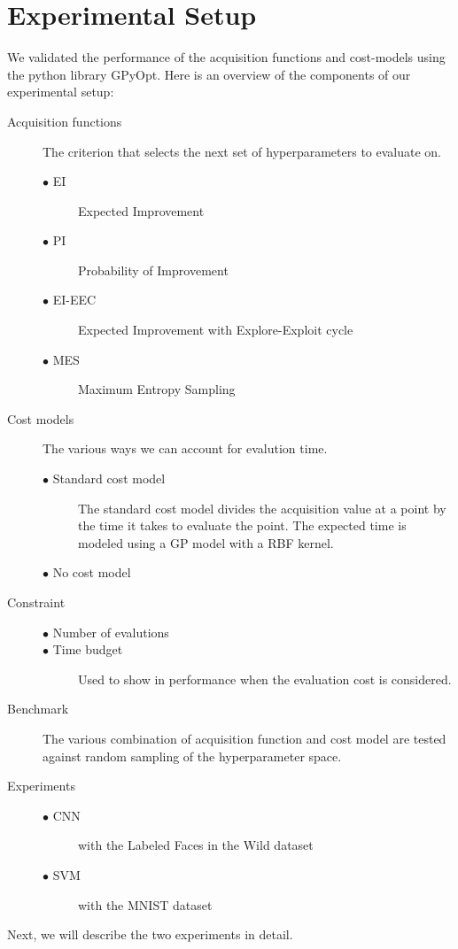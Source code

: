\documentclass[letterpaper]{article}
\begin{document}
\section{Experimental Setup}
We validated the performance of the acquisition functions and cost-models using the python library GPyOpt.
Here is an overview of the components of our experimental setup:

\begin{description}
\item[Acquisition functions] The criterion that selects the next set of hyperparameters to evaluate on.
	\begin{description}
	\item [$\bullet$ EI] Expected Improvement
	\item [$\bullet$ PI] Probability of Improvement
	\item [$\bullet$ EI-EEC] Expected Improvement with Explore-Exploit cycle
	\item [$\bullet$ MES] Maximum Entropy Sampling
	\end{description}
\item[Cost models] The various ways we can account for evalution time.
	\begin{description}
	\item [$\bullet$ Standard cost model] The standard cost model divides the acquisition value at a point by the time it takes to evaluate the point.
						       The expected time is modeled using a GP model with a RBF kernel.
	\item [$\bullet$ No cost model]
	\end{description}
\item[Constraint] \leavevmode
	\begin{description}
	\item [$\bullet$ Number of evalutions] \leavevmode
	\item [$\bullet$ Time budget] Used to show in performance when the evaluation cost is considered.
	\end{description}
\item[Benchmark] The various combination of acquisition function and cost model are tested against random sampling of the hyperparameter space.
\item[Experiments] \leavevmode
	\begin{description}
	\item [$\bullet$ CNN] with the Labeled Faces in the Wild dataset
	\item [$\bullet$ SVM] with the MNIST dataset
	\end{description}
\end{description}
Next, we will describe the two experiments in detail.
\end{document}
